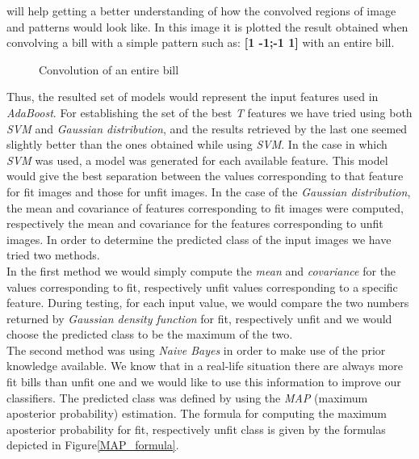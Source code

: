 \documentclass[11pt,twocolumn]{article}
\begin{document}
			will help getting a better understanding of how the convolved regions of
			image and patterns would look like. In this image it is plotted the result
			obtained when convolving a bill with a simple pattern such as: \textbf{[1
			-1;-1 1]} with an entire bill.\\ 
			\begin{figure}[!hbtp]
				\centering
				\caption{Convolution of an entire bill}
				\label{convolved}
			\end{figure} 
			Thus, the resulted set of models would represent the input features used in
			\emph{AdaBoost}. For establishing the set of the best \emph{T} features we
			have tried using both \emph{SVM} and \emph{Gaussian distribution}, and the
			results retrieved by the last one seemed slightly better than the ones
			obtained while using \emph{SVM}. In the case in which \emph{SVM} was used, a
			model was generated for each available feature. This model would give the
			best separation between the values corresponding to that feature for fit
			images and those for unfit images. In the case of the \emph{Gaussian
			distribution}, the mean and covariance of features corresponding to fit
			images were computed, respectively the mean and covariance for the features
			corresponding to unfit images. In order to determine the predicted class of
			the input images we have tried two methods.\\ 
			\hspace*{10px}In the first method we would simply compute the \emph{mean} and
			\emph{covariance} for the values corresponding to fit, respectively unfit
			values corresponding to a specific feature. During testing, for each input
			value, we would compare the two numbers returned by \emph{Gaussian density
			function} for fit, respectively unfit and we would choose the predicted class
			to be the maximum of the two.\\ 
			\hspace*{10px}The second method was using \emph{Naive Bayes} in order to make
			use of the prior knowledge available. We know that in a real-life situation
			there are always more fit bills than unfit one and we would like to use this
			information to improve our classifiers. The predicted class was defined by
			using the \emph{MAP} (maximum aposterior probability) estimation. The formula
			for computing the maximum aposterior probability for fit, respectively unfit
			class is given by the formulas depicted in Figure\ref{MAP_formula}.\\
\end{document}
